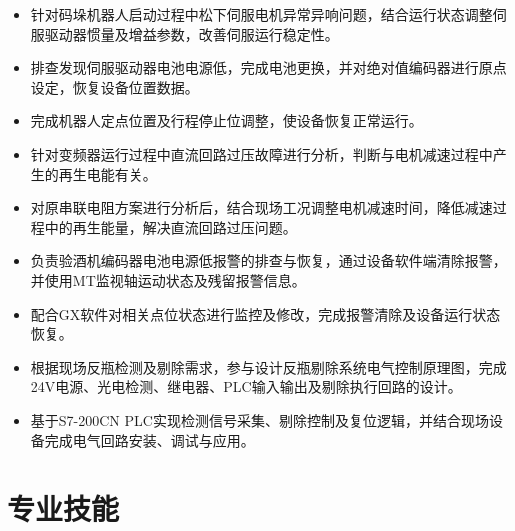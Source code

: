 \documentclass{resume}
\begin{document}

\begin{itemize}
  \item 针对码垛机器人启动过程中松下伺服电机异常异响问题，结合运行状态调整伺服驱动器惯量及增益参数，改善伺服运行稳定性。
  \item 排查发现伺服驱动器电池电源低，完成电池更换，并对绝对值编码器进行原点设定，恢复设备位置数据。
  \item 完成机器人定点位置及行程停止位调整，使设备恢复正常运行。
\end{itemize}


\begin{itemize}
  \item 针对变频器运行过程中直流回路过压故障进行分析，判断与电机减速过程中产生的再生电能有关。
  \item 对原串联电阻方案进行分析后，结合现场工况调整电机减速时间，降低减速过程中的再生能量，解决直流回路过压问题。
\end{itemize}


\begin{itemize}
  \item 负责验酒机编码器电池电源低报警的排查与恢复，通过设备软件端清除报警，并使用MT监视轴运动状态及残留报警信息。
  \item 配合GX软件对相关点位状态进行监控及修改，完成报警清除及设备运行状态恢复。
\end{itemize}


\begin{itemize}
  \item 根据现场反瓶检测及剔除需求，参与设计反瓶剔除系统电气控制原理图，完成24V电源、光电检测、继电器、PLC输入输出及剔除执行回路的设计。
  \item 基于S7-200CN PLC实现检测信号采集、剔除控制及复位逻辑，并结合现场设备完成电气回路安装、调试与应用。
\end{itemize}


\section{专业技能}
\end{document}

